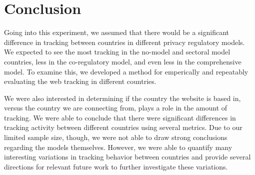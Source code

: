 \documentclass[conference]{IEEEtran}
\begin{document}
\section{Conclusion}
Going into this experiment, we assumed that there would be a significant difference in tracking between countries in different privacy regulatory models. We expected to see the most tracking in the no-model and sectoral model countries, less in the co-regulatory model, and even less in the comprehensive model. To examine this, we developed a method for emperically and repeatably evaluating the web tracking in different countries.  

We were also interested in determining if the country the website is based in, versus the country we are connecting from, plays a role in the amount of tracking. We were able to conclude that there were significant differences in tracking activity between different countries using several metrics. Due to our limited sample size, though, we were not able to draw strong conclusions regarding the models themselves. However, we were able to quantify many interesting variations in tracking behavior between countries and provide several directions for relevant future work to further investigate these variations.



%
\end{document}
